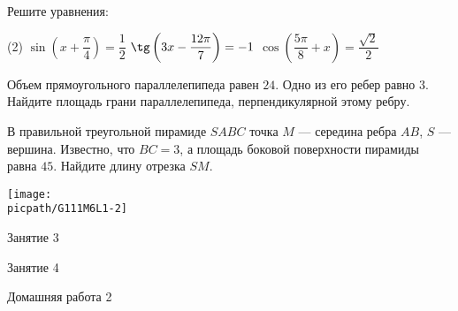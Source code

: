\begin{homework}[number=1]
	\begin{listofex}
		\item Решите уравнения:
		\begin{tasks}(2)
			\task \( \sin \left( x+\dfrac{\pi}{4} \right) = \dfrac{1}{2} \)
			\task \( \tg \left( 3x-\dfrac{12\pi}{7} \right) = -1 \)
			\task \( \cos \left( \dfrac{5\pi}{8}+x \right) = \dfrac{\sqrt{2}}{2} \)
		\end{tasks}
		\item Объем прямоугольного параллелепипеда равен \(24\). Одно из его ребер равно \(3\). Найдите площадь грани параллелепипеда, перпендикулярной этому ребру.
		\item 
		\begin{minipage}[t]{\bodywidth}
			В правильной треугольной пирамиде \(SABC\) точка \(M\) --- середина ребра \(AB\), \(S\) --- вершина. Известно, что \(BC = 3\), а площадь боковой поверхности пирамиды равна \(45\). Найдите длину отрезка \(SM\).
		\end{minipage}
		\hspace{0.02\linewidth}
		\begin{minipage}[t]{\picwidth}
			\texttt{[image: \\picpath/G111M6L1-2]}
		\end{minipage}
	\end{listofex}
\end{homework}

\begin{class}[number=3]
	\begin{listofex}
		\item Занятие 3 
	\end{listofex}
\end{class}

\begin{class}[number=4]
	\begin{listofex}
		\item Занятие 4
	\end{listofex}
\end{class}

\begin{homework}[number=2]
	\begin{listofex}
		\item Домашняя работа 2
	\end{listofex}
\end{homework}


